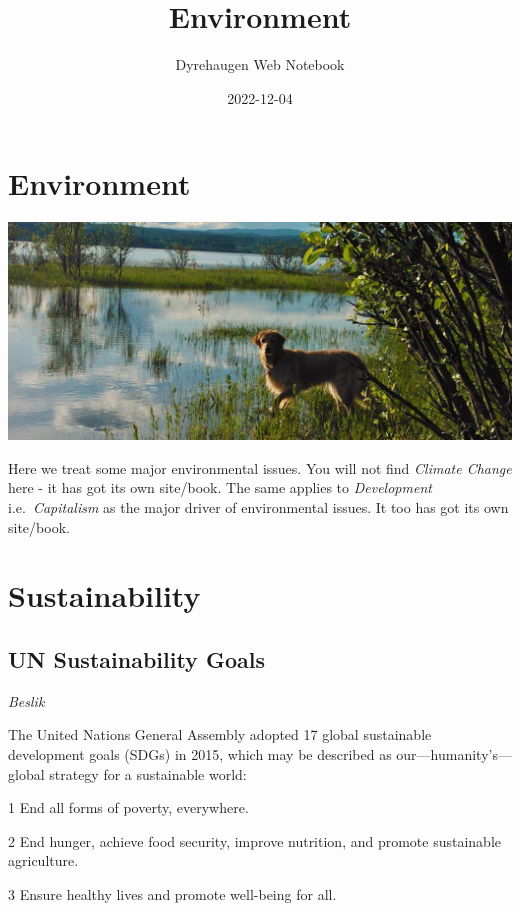\documentclass[
]{book}
\title{Environment}
\author{Dyrehaugen Web Notebook}
\date{2022-12-04}
\begin{document}
\maketitle

{
\setcounter{tocdepth}{1}
\tableofcontents
}
\hypertarget{environment}{%
\chapter{Environment}\label{environment}}

\includegraphics{fig/zelda.jpg}

Here we treat some major environmental issues.
You will not find \emph{Climate Change} here - it has got its own site/book.
The same applies to \emph{Development} i.e.~\emph{Capitalism} as the major
driver of environmental issues.
It too has got its own site/book.

\hypertarget{sustainability}{%
\chapter{Sustainability}\label{sustainability}}

\hypertarget{un-sustainability-goals}{%
\section{UN Sustainability Goals}\label{un-sustainability-goals}}

\emph{Beslik}

The United Nations General Assembly adopted 17 global sustainable development goals (SDGs) in 2015, which may be described as our---humanity's---global strategy for a sustainable world:

1 End all forms of poverty, everywhere.

2 End hunger, achieve food security, improve nutrition, and promote sustainable agriculture.

3 Ensure healthy lives and promote well-being for all.
\end{document}
